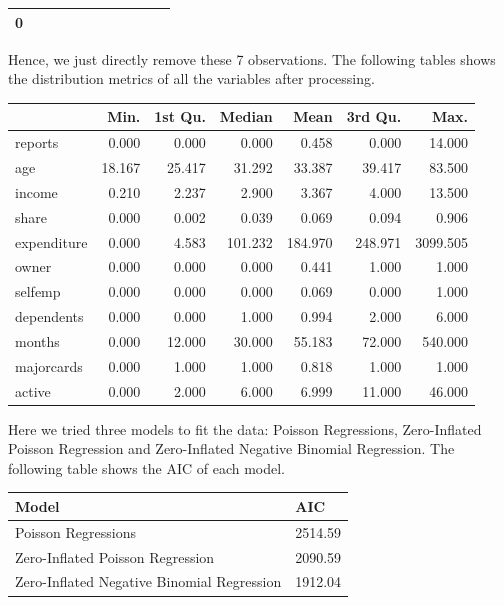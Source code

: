 \documentclass[
]{article}
\begin{document}
\begin{longtable}[]{@{}rrrrrrrrrrr@{}}
\begin{minipage}[t]{0.06\columnwidth}
0\strut
\end{minipage} & \begin{minipage}[t]{0.09\columnwidth}\raggedleft
0\strut
\end{minipage} & \begin{minipage}[t]{0.06\columnwidth}\raggedleft
1\strut
\end{minipage} & \begin{minipage}[t]{0.09\columnwidth}\raggedleft
1\strut
\end{minipage} & \begin{minipage}[t]{0.06\columnwidth}\raggedleft
9\strut
\end{minipage}\tabularnewline
\bottomrule
\end{longtable}

Hence, we just directly remove these 7 observations. The following
tables shows the distribution metrics of all the variables after
processing.

\begin{longtable}[]{@{}lrrrrrr@{}}
\toprule
& Min. & 1st Qu. & Median & Mean & 3rd Qu. & Max.\tabularnewline
\midrule
\endhead
reports & 0.000 & 0.000 & 0.000 & 0.458 & 0.000 & 14.000\tabularnewline
age & 18.167 & 25.417 & 31.292 & 33.387 & 39.417 & 83.500\tabularnewline
income & 0.210 & 2.237 & 2.900 & 3.367 & 4.000 & 13.500\tabularnewline
share & 0.000 & 0.002 & 0.039 & 0.069 & 0.094 & 0.906\tabularnewline
expenditure & 0.000 & 4.583 & 101.232 & 184.970 & 248.971 &
3099.505\tabularnewline
owner & 0.000 & 0.000 & 0.000 & 0.441 & 1.000 & 1.000\tabularnewline
selfemp & 0.000 & 0.000 & 0.000 & 0.069 & 0.000 & 1.000\tabularnewline
dependents & 0.000 & 0.000 & 1.000 & 0.994 & 2.000 &
6.000\tabularnewline
months & 0.000 & 12.000 & 30.000 & 55.183 & 72.000 &
540.000\tabularnewline
majorcards & 0.000 & 1.000 & 1.000 & 0.818 & 1.000 &
1.000\tabularnewline
active & 0.000 & 2.000 & 6.000 & 6.999 & 11.000 & 46.000\tabularnewline
\bottomrule
\end{longtable}

Here we tried three models to fit the data: Poisson Regressions,
Zero-Inflated Poisson Regression and Zero-Inflated Negative Binomial
Regression. The following table shows the AIC of each model.

\begin{longtable}[]{@{}ll@{}}
\toprule
Model & AIC\tabularnewline
\midrule
\endhead
Poisson Regressions & 2514.59\tabularnewline
Zero-Inflated Poisson Regression & 2090.59\tabularnewline
Zero-Inflated Negative Binomial Regression & 1912.04\tabularnewline
\bottomrule
\end{longtable}
\end{document}
